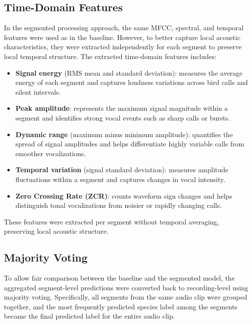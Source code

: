 \documentclass[runningheads]{llncs}
\begin{document}
\subsection{Time-Domain Features}

In the segmented processing approach, the same MFCC, spectral, and temporal features were used as in the baseline. However, to better capture local acoustic characteristics, they were extracted independently for each segment to preserve local temporal structure. The extracted time-domain features includes:
\begin{itemize}
    \item \textbf{Signal energy} (RMS mean and standard deviation): measures the average energy of each segment and captures loudness variations across bird calls and silent intervals.

    \item \textbf{Peak amplitude}: represents the maximum signal magnitude within a segment and identifies strong vocal events such as sharp calls or bursts.

    \item \textbf{Dynamic range} (maximum minus minimum amplitude): quantifies the spread of signal amplitudes and helps differentiate highly variable calls from smoother vocalizations.

    \item \textbf{Temporal variation} (signal standard deviation): measures amplitude fluctuations within a segment and captures changes in vocal intensity.

    \item \textbf{Zero Crossing Rate (ZCR)}: counts waveform sign changes and helps distinguish tonal vocalizations from noisier or rapidly changing calls.
\end{itemize}

These features were extracted per segment without temporal averaging, preserving local acoustic structure.

\subsection{Majority Voting}

To allow fair comparison between the baseline and the segmented model, the aggregated segment-level predictions were converted back to recording-level using majority voting. Specifically, all segments from the same audio clip were grouped together, and the most frequently predicted species label among the segments became the final predicted label for the entire audio clip.
\end{document}
